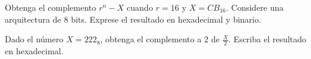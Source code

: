 \documentclass[addpoints]{exam}
\begin{document}
\begin{questions}

  

\question Obtenga el complemento $r^n-X$ cuando $r=16$ y
  $X=CB_{16}$. Considere una arquitectura de 8 bits. Exprese el
  resultado en hexadecimal y binario.


  

\droptotalpoints %

\question[1 \half] Dado el número $X=222_8$, obtenga el complemento a 2 de
  $\frac{X}{2}$. Escriba el resultado en hexadecimal.


\droptotalpoints


\end{questions}
\end{document}
